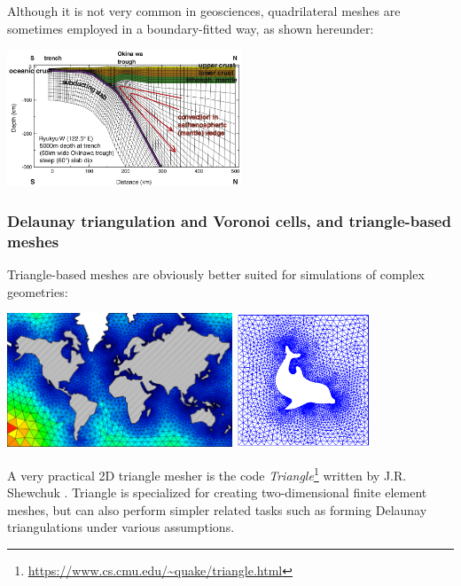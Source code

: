 
Although it is not very common in geosciences, quadrilateral meshes are sometimes 
employed in a boundary-fitted way, as shown hereunder:

\begin{center}
\includegraphics[width=7cm]{images/meshes/gukt16}\\
\end{center}


\subsubsection{Delaunay triangulation and Voronoi cells, and triangle-based meshes}

Triangle-based meshes are obviously better suited for simulations of complex geometries:
\begin{center}
\includegraphics[height=4cm]{images/meshes/tr1.png}
\includegraphics[height=4cm]{images/meshes/dolfin.png}
\end{center}

A very practical 2D triangle mesher is the code {\sl Triangle}\footnote{\url{https://www.cs.cmu.edu/~quake/triangle.html}}
written by J.R. Shewchuk \cite{shew96}.
Triangle is specialized for creating two-dimensional finite element meshes, but can also perform simpler related tasks such as forming Delaunay triangulations under various assumptions.

